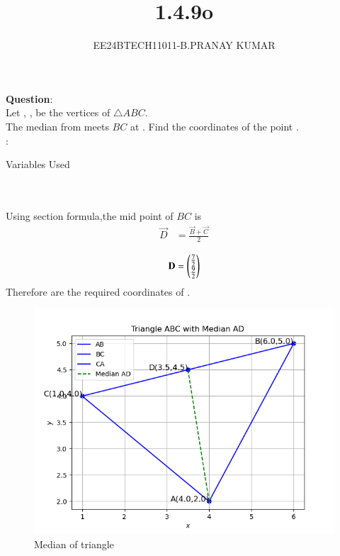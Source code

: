 \documentclass[journal]{IEEEtran}
\begin{document}

\vspace{3cm}

\title{1.4.9o}
\author{EE24BTECH11011-B.PRANAY KUMAR
}
 \maketitle
{\let\newpage\relax\maketitle}

\renewcommand{\thefigure}{\theenumi}
\renewcommand{\thetable}{\theenumi}
\setlength{\intextsep}{10pt} %


\renewcommand{\thetable}{\theenumi}




\textbf{Question}:\\
Let  ,  ,   be the vertices of \(\triangle ABC\). \\
The median from  meets \(BC\) at . Find the coordinates of the point .\\
\solution:
\begin{table}[h!]    
  \centering
  
  \caption{Variables Used}
  \label{tab1-1.4-9o}
\end{table}\\
\\
Using section formula,the mid point of $BC$ is
\begin{align}
\vec{D} &= \frac{\vec{B} + \vec{C}}{2}\\
\end{align}
\begin{align}
    \mathbf{D} = \begin{pmatrix}{\frac{7}{2}}\\{\frac{9}{2}}\end{pmatrix}
\end{align}
Therefore  are the required coordinates of .
\begin{figure}[h!]
   \centering
   \includegraphics[width=0.7\linewidth]{figs/triangle_plot.png}
   \caption{Median of triangle}
\end{figure}
\end{document}
